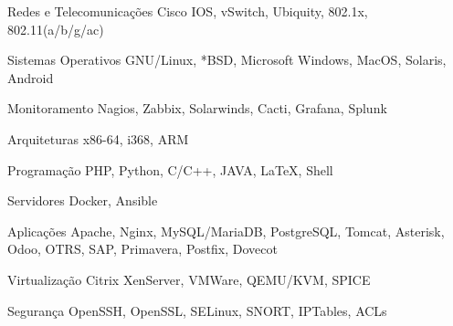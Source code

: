 


\begin{cvskills}


\cvskill
{Redes e Telecomunicações} %
{Cisco IOS, vSwitch, Ubiquity, 802.1x, 802.11(a/b/g/ac)} %


\cvskill
{Sistemas Operativos} %
{GNU/Linux, *BSD, Microsoft Windows, MacOS, Solaris, Android} %


\cvskill
{Monitoramento} %
{Nagios, Zabbix, Solarwinds, Cacti, Grafana, Splunk} %


\cvskill
{Arquiteturas} %
{x86-64, i368, ARM} %



\cvskill
{Programação} %
{PHP, Python, C/C++, JAVA, LaTeX, Shell} %


\cvskill
{Servidores} %
{Docker, Ansible} %


\cvskill
{Aplicações} %
{Apache, Nginx, MySQL/MariaDB, PostgreSQL, Tomcat, Asterisk, Odoo, OTRS, SAP, Primavera, Postfix, Dovecot} %


\cvskill
{Virtualização} %
{Citrix XenServer, VMWare, QEMU/KVM, SPICE} %


\cvskill
{Segurança} %
{OpenSSH, OpenSSL, SELinux, SNORT, IPTables, ACLs} %


\end{cvskills}
